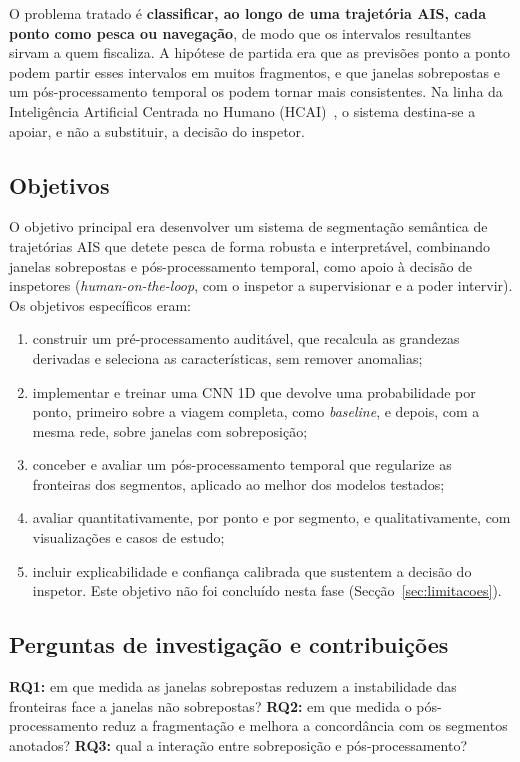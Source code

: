 \documentclass{article}
\begin{document}
O problema tratado é \textbf{classificar, ao longo de uma trajetória AIS, cada ponto como pesca ou navegação}, de modo que os intervalos resultantes sirvam a quem fiscaliza. A hipótese de partida era que as previsões ponto a ponto podem partir esses intervalos em muitos fragmentos, e que janelas sobrepostas e um pós-processamento temporal os podem tornar mais consistentes. Na linha da Inteligência Artificial Centrada no Humano (HCAI)~\cite{shneiderman2020}, o sistema destina-se a apoiar, e não a substituir, a decisão do inspetor.

\subsection{Objetivos}

O objetivo principal era desenvolver um sistema de segmentação semântica de trajetórias AIS que detete pesca de forma robusta e interpretável, combinando janelas sobrepostas e pós-processamento temporal, como apoio à decisão de inspetores (\emph{human-on-the-loop}, com o inspetor a supervisionar e a poder intervir). Os objetivos específicos eram:
\begin{enumerate}
\item construir um pré-processamento auditável, que recalcula as grandezas derivadas e seleciona as características, sem remover anomalias;
\item implementar e treinar uma CNN 1D que devolve uma probabilidade por ponto, primeiro sobre a viagem completa, como \emph{baseline}, e depois, com a mesma rede, sobre janelas com sobreposição;
\item conceber e avaliar um pós-processamento temporal que regularize as fronteiras dos segmentos, aplicado ao melhor dos modelos testados;
\item avaliar quantitativamente, por ponto e por segmento, e qualitativamente, com visualizações e casos de estudo;
\item incluir explicabilidade e confiança calibrada que sustentem a decisão do inspetor. Este objetivo não foi concluído nesta fase (Secção~\ref{sec:limitacoes}).
\end{enumerate}

\subsection{Perguntas de investigação e contribuições}

\textbf{RQ1:} em que medida as janelas sobrepostas reduzem a instabilidade das fronteiras face a janelas não sobrepostas? \textbf{RQ2:} em que medida o pós-processamento reduz a fragmentação e melhora a concordância com os segmentos anotados? \textbf{RQ3:} qual a interação entre sobreposição e pós-processamento?
\end{document}
